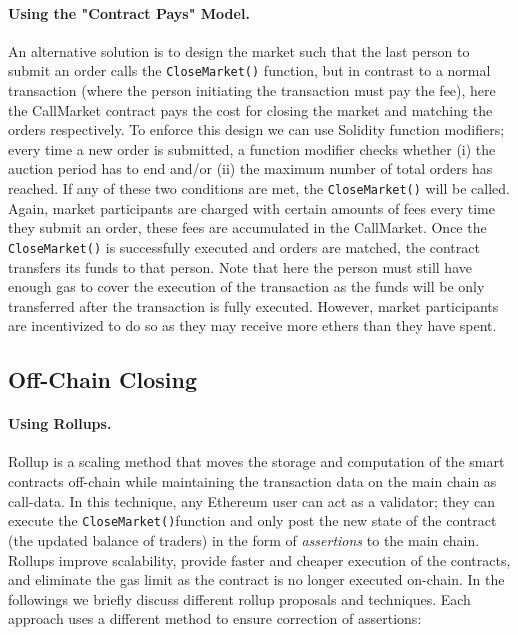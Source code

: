 \paragraph{Using the "Contract Pays" Model.} An alternative solution is to design the market such that the last person to submit an order calls the \texttt{CloseMarket()} function, but in contrast to a normal transaction (where the person initiating the transaction must pay the fee), here the CallMarket contract pays the cost for closing the market and matching the orders respectively. To enforce this design we can use Solidity function modifiers; every time a new order is submitted, a function modifier checks whether (i) the auction period has to end and/or (ii) the maximum number of total orders has reached. If any of these two conditions are met, the \texttt{CloseMarket()} will be called. Again, market participants are charged with certain amounts of fees every time they submit an order, these fees are accumulated in the CallMarket. Once the \texttt{CloseMarket()} is successfully executed and orders are matched, the contract transfers its funds to that person. Note that here the person must still have enough gas to cover the execution of the transaction as the funds will be only transferred after the transaction is fully executed. However, market participants are incentivized to do so as they may receive more ethers than they have spent.


\subsection{Off-Chain Closing}
\label{sec:rollups}

\paragraph{Using Rollups.} Rollup is a scaling method that moves the storage and computation of the smart contracts off-chain while maintaining the transaction data on the main chain as call-data. In this technique, any Ethereum user can act as a validator; they can execute the \texttt{CloseMarket()}function and only post the new state of the contract (the updated balance of traders) in the form of \textit{assertions} to the main chain. Rollups improve scalability, provide faster and cheaper execution of the contracts, and eliminate the gas limit as the contract is no longer executed on-chain.
In the followings we briefly discuss different rollup proposals and techniques. Each approach uses a different method to ensure correction of assertions:

